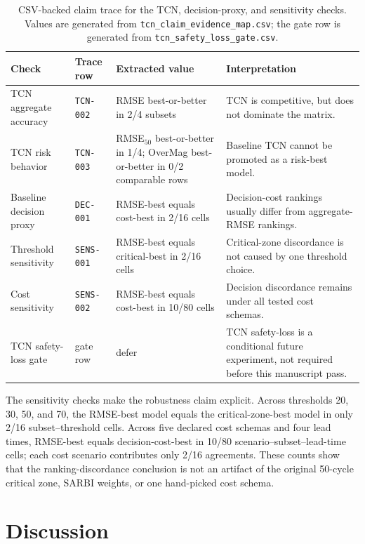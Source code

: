 \documentclass[10pt,twocolumn]{article}
\begin{document}
\begin{table}[t]
\centering
\caption{CSV-backed claim trace for the TCN, decision-proxy, and sensitivity checks. Values are generated from \texttt{tcn\_claim\_evidence\_map.csv}; the gate row is generated from \texttt{tcn\_safety\_loss\_gate.csv}.}
\label{tab:tcn-claim-trace}
\small
\begin{tabularx}{\textwidth}{p{}p{}p{}X}
\toprule
Check & Trace row & Extracted value & Interpretation \\
\midrule
TCN aggregate accuracy & \texttt{TCN-002} & RMSE best-or-better in 2/4 subsets & TCN is competitive, but does not dominate the matrix. \\
TCN risk behavior & \texttt{TCN-003} & RMSE$_{50}$ best-or-better in 1/4; OverMag best-or-better in 0/2 comparable rows & Baseline TCN cannot be promoted as a risk-best model. \\
Baseline decision proxy & \texttt{DEC-001} & RMSE-best equals cost-best in 2/16 cells & Decision-cost rankings usually differ from aggregate-RMSE rankings. \\
Threshold sensitivity & \texttt{SENS-001} & RMSE-best equals critical-best in 2/16 cells & Critical-zone discordance is not caused by one threshold choice. \\
Cost sensitivity & \texttt{SENS-002} & RMSE-best equals cost-best in 10/80 cells & Decision discordance remains under all tested cost schemas. \\
TCN safety-loss gate & gate row & defer & TCN safety-loss is a conditional future experiment, not required before this manuscript pass. \\
\bottomrule
\end{tabularx}
\end{table}

The sensitivity checks make the robustness claim explicit. Across thresholds 20, 30, 50, and 70, the RMSE-best model equals the critical-zone-best model in only 2/16 subset--threshold cells. Across five declared cost schemas and four lead times, RMSE-best equals decision-cost-best in 10/80 scenario--subset--lead-time cells; each cost scenario contributes only 2/16 agreements. These counts show that the ranking-discordance conclusion is not an artifact of the original 50-cycle critical zone, SARBI weights, or one hand-picked cost schema.
\clearpage
\section{Discussion}
\end{document}
